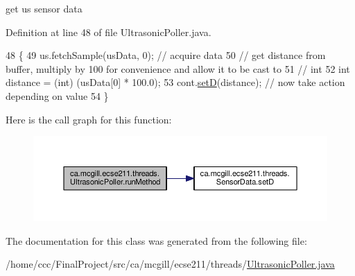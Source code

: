 get us sensor data 

Definition at line 48 of file Ultrasonic\+Poller.\+java.


\begin{DoxyCode}
48                              \{
49     us.fetchSample(usData, 0); \textcolor{comment}{// acquire data}
50     \textcolor{comment}{// get distance from buffer, multiply by 100 for convenience and allow it to be cast to}
51     \textcolor{comment}{// int}
52     \textcolor{keywordtype}{int} distance = (int) (usData[0] * 100.0);
53     cont.\hyperlink{classca_1_1mcgill_1_1ecse211_1_1threads_1_1_sensor_data_a2c1f8e625478b89aabe6e9911e482ef3}{setD}(distance); \textcolor{comment}{// now take action depending on value}
54   \}
\end{DoxyCode}
Here is the call graph for this function\+:\nopagebreak
\begin{figure}[H]
\begin{center}
\leavevmode
\includegraphics[width=350pt]{classca_1_1mcgill_1_1ecse211_1_1threads_1_1_ultrasonic_poller_a8e6a84342aedc1b72741dbc2e80148c4_cgraph}
\end{center}
\end{figure}


The documentation for this class was generated from the following file\+:\begin{DoxyCompactItemize}
\item 
/home/ccc/\+Final\+Project/src/ca/mcgill/ecse211/threads/\hyperlink{_ultrasonic_poller_8java}{Ultrasonic\+Poller.\+java}\end{DoxyCompactItemize}
